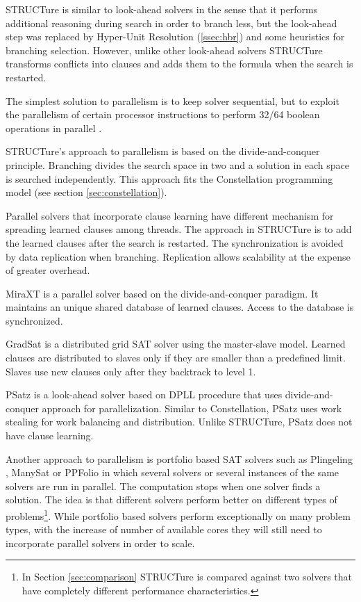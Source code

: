 STRUCTure is similar to look-ahead solvers in the sense that it
performs additional reasoning during search in order to branch less,
but the look-ahead step was replaced by Hyper-Unit Resolution
(\ref{ssec:hbr}) and some heuristics for branching selection.
However, unlike other look-ahead solvers STRUCTure transforms
conflicts into clauses and adds them to the formula when the search
is restarted.

The simplest solution to parallelism is to keep solver
sequential, but to exploit the parallelism of certain processor
instructions to perform 32/64 boolean operations in parallel
\cite{mine:heule_parallel}.

STRUCTure's approach to parallelism is based on the
divide-and-conquer principle. Branching divides the search space in
two and a solution in each space is searched independently. This
approach fits the Constellation programming model (see section
\ref{sec:constellation}).

Parallel solvers that incorporate clause learning have different
mechanism for spreading learned clauses among threads. The approach
in STRUCTure is to add the learned clauses after the search is
restarted. The synchronization is avoided by data replication when
branching. Replication allows scalability at the expense of greater
overhead.

MiraXT \cite{mine:miraxt} is a parallel solver based on the
divide-and-conquer paradigm. It maintains an unique shared database
of learned clauses. Access to the database is synchronized.

GradSat \cite{Chrabakh03gradsat:a} is a distributed grid SAT solver
using the master-slave model. Learned clauses are distributed to
slaves only if they are smaller than a predefined limit.  Slaves use
new clauses only after they backtrack to level 1.

PSatz \cite{Jurkowiak_aparallelization} is a look-ahead solver
based on DPLL procedure that uses divide-and-conquer approach for
parallelization. Similar to Constellation, PSatz uses work stealing
for work balancing and distribution. Unlike STRUCTure, PSatz does
not have clause learning.

Another approach to parallelism is portfolio based SAT
solvers such as Plingeling \cite{mine:plingeling}, ManySat
\cite{Hamadi09manysat:a} or PPFolio \cite{mine:ppfolio} in which
several solvers or several instances of the same solvers are run in
parallel. The computation stops when one solver finds a solution. The
idea is that different solvers perform better on different types
of problems\footnote{In Section \ref{sec:comparison} STRUCTure
is compared against two solvers that have completely different
performance characteristics.}. While portfolio based solvers
perform exceptionally on many problem types, with the increase
of number of available cores they will still need to incorporate
parallel solvers in order to scale.

